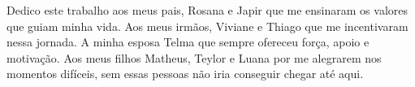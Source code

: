 Dedico este trabalho aos meus pais, Rosana e Japir que me ensinaram os valores que guiam minha vida. Aos meus irmãos, Viviane e Thiago que me incentivaram nessa jornada. A minha esposa Telma que sempre ofereceu força, apoio e motivação. Aos meus filhos Matheus, Teylor e Luana por me alegrarem nos momentos difíceis, sem essas pessoas não iria conseguir chegar até aqui.